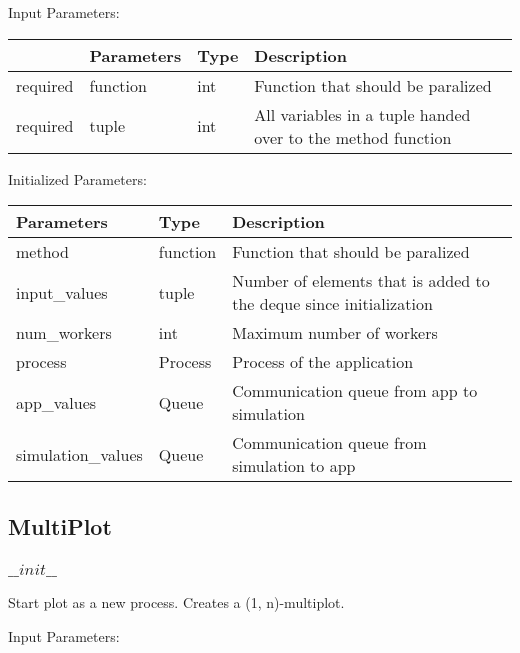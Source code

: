 \documentclass[
	ngerman,
	accentcolor=9c,%
	type=intern,
	marginpar=false
	]{tudapub}
\begin{document}
\vspace{0.5cm}
\noindent Input Parameters:
\vspace{0.5cm}

\begin{tabular}{|p{}|p{}|p{}| p{}|}
\hline
 & \textbf{Parameters} & \textbf{Type} & \textbf{Description} \\
\hline
required & function & int & Function that should be paralized \\
\hline
required & tuple & int & All variables in a tuple handed over to the method function \\
\hline
\end{tabular}

\vspace{0.5cm}
\noindent Initialized Parameters:
\vspace{0.5cm}

\begin{tabular}{|p{}| p{}| p{}|}
\hline
\textbf{Parameters} & \textbf{Type} & \textbf{Description} \\
\hline
method & function & Function that should be paralized \\
\hline
input\_values & tuple & Number of elements that is added to the deque since initialization \\
\hline
num\_workers & int & Maximum number of workers \\
\hline
process & Process & Process of the application \\
\hline
app\_values & Queue & Communication queue from app to simulation \\
\hline
simulation\_values & Queue & Communication queue from simulation to app \\
\hline
\end{tabular}
\vspace{1cm}


\subsection{MultiPlot}
\subsubsection{$\_\_init\_\_$}
\noindent Start plot as a new process. Creates a (1, n)-multiplot. 


\vspace{0.5cm}
\noindent Input Parameters:
\vspace{0.5cm}
\end{document}
